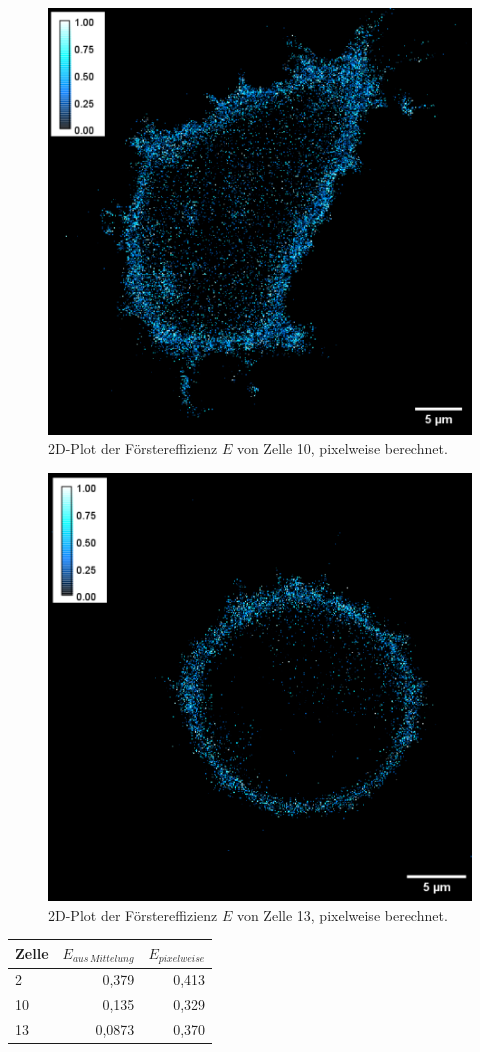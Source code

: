 \begin{figure}[h]
    \centering
    \includegraphics[scale = 0.45]{Bilder/E10.png}
    \caption{2D-Plot der Förstereffizienz $E$ von Zelle 10, pixelweise berechnet.}
    \label{bild:E10}
\end{figure}

\begin{figure}[h]
    \centering
    \includegraphics[scale = 0.45]{Bilder/E13.png}
    \caption{2D-Plot der Förstereffizienz $E$ von Zelle 13, pixelweise berechnet.}
    \label{bild:E13}
\end{figure}

\begin{center}
    \centering
    \begin{tabular}{l|r|r}
        Zelle & $E_{aus \, Mittelung}$ & $E_{pixelweise}$\\
        \hline
        2 & 0,379 & 0,413\\
        10 & 0,135 & 0,329\\
        13 & 0,0873 & 0,370\\
    \end{tabular}
    \label{tab:VerglE}
\end{center}